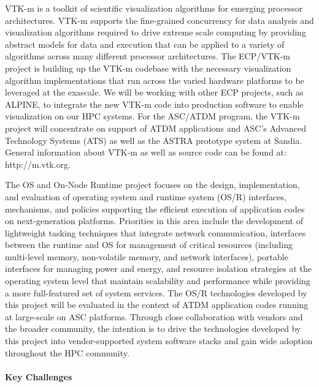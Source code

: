 VTK-m is a toolkit of scientific visualization algorithms for emerging processor architectures. VTK-m supports the fine-grained concurrency for data analysis and visualization algorithms required to drive extreme scale computing by providing abstract models for data and execution that can be applied to a variety of algorithms across many different processor architectures.  The ECP/VTK-m project is building up the VTK-m codebase with the necessary visualization algorithm implementations that run across the varied hardware platforms to be leveraged at the exascale. We will be working with other ECP projects, such as ALPINE, to integrate the new VTK-m code into production software to enable visualization on our HPC systems.  For the ASC/ATDM program, the VTK-m project will concentrate on support of ATDM applications and ASC’s Advanced Technology Systems (ATS) as well as the ASTRA prototype system at Sandia.  General information about VTK-m as well as source code can be found at: http://m.vtk.org.

The OS and On-Node Runtime project focuses on the design, implementation, and evaluation of operating system and runtime system (OS/R) interfaces, mechanisms, and policies supporting the efficient execution of application codes on next-generation platforms. Priorities in this area include the development of lightweight tasking techniques that integrate network communication, interfaces between the runtime and OS for management of critical resources (including multi-level memory, non-volatile memory, and network interfaces), portable interfaces for managing power and energy, and resource isolation strategies at the operating system level that maintain scalability and performance while providing a more full-featured set of system services. The OS/R technologies developed by this project will be evaluated in the context of ATDM application codes running at large-scale on ASC platforms. Through close collaboration with vendors and the broader community, the intention is to drive the technologies developed by this project into vendor-supported system software stacks and gain wide adoption throughout the HPC community.

\paragraph{Key  Challenges} \leavevmode \\

